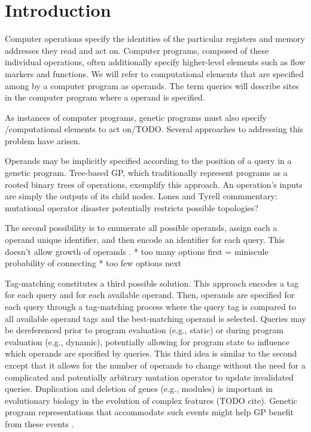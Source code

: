 \section{Introduction}

Computer operations specify the identities of the particular registers and memory addresses they read and act on.
Computer programs, composed of these individual operations, often additionally specify higher-level elements such as flow markers and functions.
We will refer to computational elements that are specified among by a computer program as operands.
The term queries will describe sites in the computer program where a operand is specified.

As instances of computer programs, genetic programs must also specify /computational elements to act on/TODO.
Several approaches to addressing this problem have arisen.

Operands may be implicitly specified according to the position of a query in a genetic program.
Tree-based GP, which traditionally represent programs as a rooted binary trees of operations, exemplify this approach.
An operation's inputs are simply the outputs of its child nodes.
Lones and Tyrell commmentary: mutational operator disaster
potentially restricts possible topologies?

The second possibility is to enumerate all possible operands, assign each a operand unique identifier, and then encode an identifier for each query.
This doesn't allow growth of operands .
* too many options first = miniscule probability of connecting
* too few options next

Tag-matching constitutes a third possible solution.
This approach encodes a tag for each query and for each available operand.
Then, operands are specified for each query through a tag-matching process where the query tag is compared to all available operand tags and the best-matching operand is selected.
Queries may be dereferenced prior to program evaluation (e.g., static) or during program evaluation (e.g., dynamic), potentially allowing for program state to influence which operands are specified by queries.
This third idea is similar to the second except that it allows for the number of operands to change without the need for a complicated and potentially arbitrary mutation operator to update invalidated queries.
Duplication and deletion of genes (e.g., modules) is important in evolutionary biology in the evolution of complex features (TODO cite).
Genetic program representations that accommodate such events might help GP benefit from these events .

